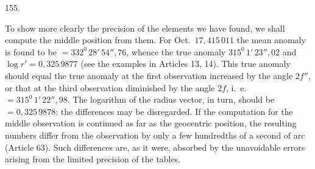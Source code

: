 \par{}\medskip
\hypertarget{native-209-article155}{}
\begin{center}155.\end{center}
To show more clearly the precision of the elements we have found, we shall compute the middle position from them. For Oct.\ $17{,}415\,011$ the mean anomaly is found to be $=332^{0}\,28'\,54''{,}76$, whence the true anomaly $315^{0}\,1'\,23''{,}02$ and $\log r'=0{,}325\,9877$ (see the examples in Articles 13, 14). This true anomaly should equal the true anomaly at the first observation increased by the angle $2f''$, or that at the third observation diminished by the angle $2f$, i.\ e.\ $=315^{0}\,1'\,22''{,}98$. The logarithm of the radius vector, in turn, should be $=0{,}325\,9878$: the differences may be disregarded. If the computation for the middle observation is continued as far as the geocentric position, the resulting numbers differ from the observation by only a few hundredths of a second of arc (Article 63). Such differences are, as it were, absorbed by the unavoidable errors arising from the limited precision of the tables.

